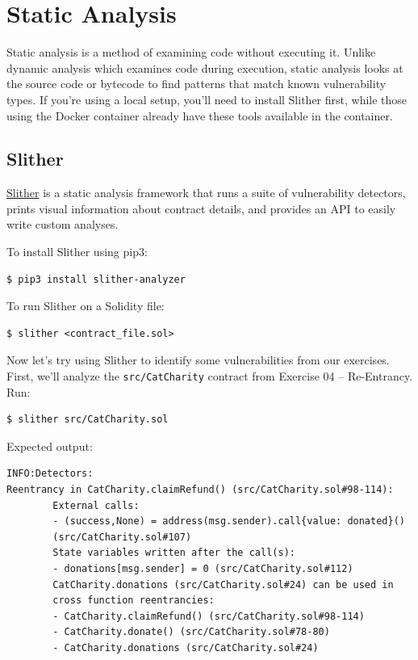 \documentclass[12pt]{article}
\begin{document}
\section{Static Analysis}

Static analysis is a method of examining code without executing it. Unlike
dynamic analysis which examines code during execution, static analysis looks at
the source code or bytecode to find patterns that match known vulnerability
types. If you're using a local setup, you'll need to install Slither first,
while those using the Docker container already have these tools available in
the container.

\subsection*{Slither}

\href{https://github.com/crytic/slither}{Slither} is a static analysis framework that runs a suite of vulnerability detectors, prints visual information about contract details, and provides an API to easily write custom analyses.

\medskip
\noindent
To install Slither using pip3:

\noindent \begin{minipage}{\textwidth}
    \begin{verbatim}
$ pip3 install slither-analyzer
\end{verbatim}
\end{minipage}

\medskip
\noindent
To run Slither on a Solidity file:

\begin{verbatim}
$ slither <contract_file.sol>
\end{verbatim}

\noindent
Now let's try using Slither to identify some vulnerabilities from our exercises. First, we'll analyze the \texttt{src/CatCharity} contract from Exercise 04 -- Re-Entrancy. Run:

\begin{verbatim}
$ slither src/CatCharity.sol
\end{verbatim}

\noindent
Expected output:
\begin{verbatim}
INFO:Detectors:
Reentrancy in CatCharity.claimRefund() (src/CatCharity.sol#98-114):
        External calls:
        - (success,None) = address(msg.sender).call{value: donated}() 
        (src/CatCharity.sol#107)
        State variables written after the call(s):
        - donations[msg.sender] = 0 (src/CatCharity.sol#112)
        CatCharity.donations (src/CatCharity.sol#24) can be used in 
        cross function reentrancies:
        - CatCharity.claimRefund() (src/CatCharity.sol#98-114)
        - CatCharity.donate() (src/CatCharity.sol#78-80)
        - CatCharity.donations (src/CatCharity.sol#24)
\end{verbatim}
\end{document}
